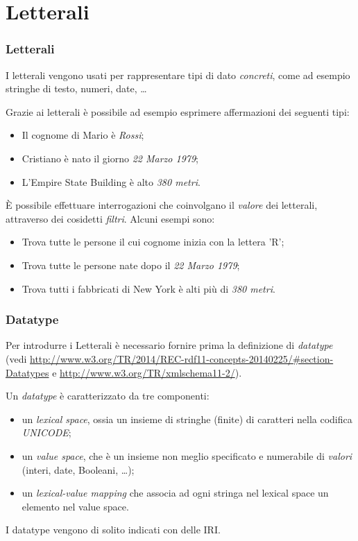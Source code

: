 \documentclass[8pt]{beamer}
\begin{document}
\section{Letterali}

\begin{frame}
\frametitle{Letterali}

I letterali vengono usati per rappresentare tipi di dato \emph{concreti},
come ad esempio stringhe di testo, numeri, date, \ldots
\vspace{\baselineskip}

Grazie ai letterali \`e possibile ad esempio esprimere affermazioni dei seguenti tipi:
\begin{itemize}
 \item Il cognome di Mario \`e \emph{Rossi};
 \item Cristiano \`e nato il giorno \emph{22 Marzo 1979};
 \item L'Empire State Building \`e alto \emph{380 metri}.
\end{itemize}
\vspace{\baselineskip}

\`E possibile effettuare interrogazioni che coinvolgano il \emph{valore}
dei letterali, attraverso dei cosidetti \emph{filtri}. Alcuni esempi sono:
\begin{itemize}
 \item Trova tutte le persone il cui cognome inizia con la lettera 'R';
 \item Trova tutte le persone nate dopo il \emph{22 Marzo 1979};
 \item Trova tutti i fabbricati di New York \`e alti pi\`u di \emph{380 metri}.
\end{itemize}
\end{frame}

\begin{frame}
\frametitle{Datatype}
Per introdurre i Letterali \`e necessario fornire prima la definizione di \emph{datatype}
(vedi \url{http://www.w3.org/TR/2014/REC-rdf11-concepts-20140225/\#section-Datatypes} e 
\url{http://www.w3.org/TR/xmlschema11-2/}).
\vspace{\baselineskip}

Un \emph{datatype} \`e caratterizzato da tre componenti:
\begin{itemize}
 \item un \emph{lexical space}, ossia un insieme di stringhe (finite) di caratteri nella codifica \emph{UNICODE};
 \item un \emph{value space}, che \`e un insieme non meglio specificato e numerabile di \emph{valori} (interi, date,
 Booleani, \ldots);
 \item un \emph{lexical-value mapping} che associa ad ogni stringa nel lexical space un elemento nel value space.
\end{itemize}
\vspace{\baselineskip}

I datatype vengono di solito indicati con delle IRI.
\end{frame}
\end{document}
